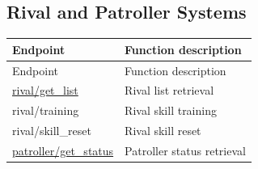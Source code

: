 \subsection{Rival and Patroller Systems}

\begin{longtable}{>{\ttfamily}p{}p{}}
\toprule
Endpoint & Function description \\
\midrule
\endfirsthead%

\toprule
Endpoint & Function description \\
\midrule
\endhead%

\hyperref[subsec:api_rival_get_list]{rival/get\_list}
    & Rival list retrieval \\

rival/training
    & Rival skill training \\

rival/skill\_reset
    & Rival skill reset \\

\hyperref[subsec:api_patroller_get_status]{patroller/get\_status}
    & Patroller status retrieval \\

\bottomrule
\end{longtable}